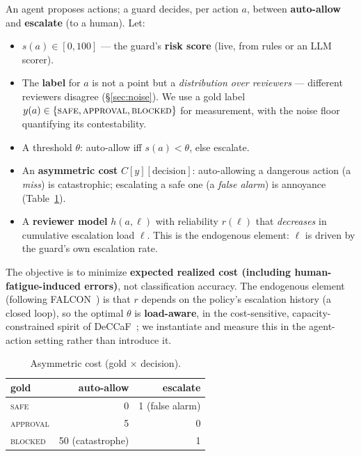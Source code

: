 \documentclass[11pt]{article}
\begin{document}
An agent proposes actions; a guard decides, per action $a$, between \textbf{auto-allow} and
\textbf{escalate} (to a human). Let:
\begin{itemize}
  \item $s(a) \in [0,100]$ --- the guard's \textbf{risk score} (live, from rules or an LLM scorer).
  \item The \textbf{label} for $a$ is not a point but a \emph{distribution over reviewers} ---
  different reviewers disagree (\S\ref{sec:noise}). We use a gold label
  $y(a) \in \{\textsc{safe}, \textsc{approval}, \textsc{blocked}\}$ for measurement, with the noise
  floor quantifying its contestability.
  \item A threshold $\theta$: auto-allow iff $s(a) < \theta$, else escalate.
  \item An \textbf{asymmetric cost} $C[y][\text{decision}]$: auto-allowing a dangerous action (a
  \emph{miss}) is catastrophic; escalating a safe one (a \emph{false alarm}) is annoyance
  (Table~\ref{tab:cost}).
  \item A \textbf{reviewer model} $h(a, \ell)$ with reliability $r(\ell)$ that \emph{decreases} in
  cumulative escalation load $\ell$. This is the endogenous element: $\ell$ is driven by the guard's
  own escalation rate.
\end{itemize}

The objective is to minimize \textbf{expected realized cost (including human-fatigue-induced
errors)}, not classification accuracy. The endogenous element (following FALCON~\cite{falcon}) is that $r$ depends on the policy's
escalation history (a closed loop), so the optimal $\theta$ is \textbf{load-aware}, in the
cost-sensitive, capacity-constrained spirit of DeCCaF~\cite{deccaf}; we instantiate and measure this in the agent-action setting
rather than introduce it.

\begin{table}[t]
\centering
\caption{Asymmetric cost (gold $\times$ decision).}
\label{tab:cost}
\begin{tabular}{lrr}
\toprule
gold & auto-allow & escalate \\
\midrule
\textsc{safe}     & 0                 & 1 (false alarm) \\
\textsc{approval} & 5                 & 0 \\
\textsc{blocked}  & 50 (catastrophe)  & 1 \\
\bottomrule
\end{tabular}
\end{table}
\end{document}
